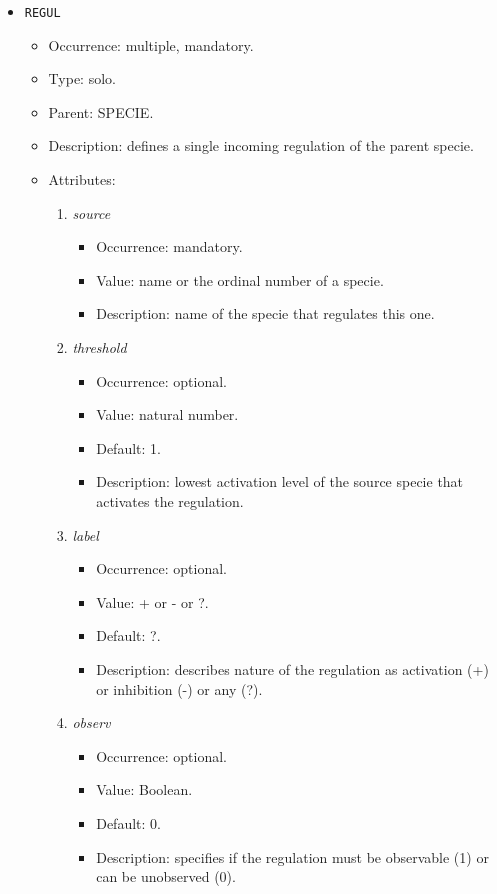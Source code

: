 \documentclass[12pt]{article}
\newenvironment{menum}{
\begin{enumerate}
  \setlength{\itemsep}{0pt}
  \setlength{\parskip}{0pt}
  \setlength{\parsep}{0pt}
}{\end{enumerate}}
\newenvironment{mitem}{
\begin{itemize}
  \setlength{\itemsep}{0pt}
  \setlength{\parskip}{0pt}
  \setlength{\parsep}{0pt}
}{\end{itemize}}
\begin{document}
\begin{mitem}
	\item \texttt{REGUL}
	\begin{mitem}
		\item Occurrence: multiple, mandatory.
		\item Type: solo.
		\item Parent: SPECIE.
		\item Description: defines a single incoming regulation of the parent specie.
		\item Attributes:	
		\begin{menum}
			\item \textit{source} 
			\begin{mitem}
				\item Occurrence: mandatory.
				\item Value: name or the ordinal number of a specie.
				\item Description: name of the specie that regulates this one.
			\end{mitem}
			\item \textit{threshold} 
			\begin{mitem}
				\item Occurrence: optional.
				\item Value: natural number.
				\item Default: 1.
				\item Description: lowest activation level of the source specie that activates the regulation.
			\end{mitem}
			\item \textit{label} 
			\begin{mitem}
				\item Occurrence: optional.
				\item Value: + or - or ?.
				\item Default: ?.
				\item Description: describes nature of the regulation as activation (+) or inhibition (-) or any (?).
			\end{mitem}
			\item \textit{observ} 
			\begin{mitem}
				\item Occurrence: optional.
				\item Value: Boolean.
				\item Default: 0.
				\item Description: specifies if the regulation must be observable (1) or can be unobserved (0).
			\end{mitem}
		\end{menum}
	\end{mitem}
\end{mitem}
		
\end{document}
